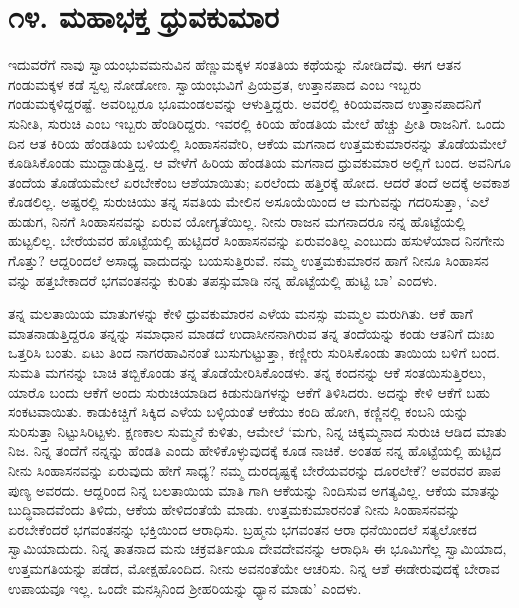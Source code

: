 
\chapter{೧೪. ಮಹಾಭಕ್ತ ಧ್ರುವಕುಮಾರ}

ಇದುವರೆಗೆ ನಾವು ಸ್ವಾಯಂಭುವಮನುವಿನ ಹೆಣ್ಣುಮಕ್ಕಳ ಸಂತತಿಯ ಕಥೆಯನ್ನು ನೋಡಿದೆವು. ಈಗ ಆತನ ಗಂಡುಮಕ್ಕಳ ಕಡೆ ಸ್ವಲ್ಪ ನೋಡೋಣ. ಸ್ವಾಯಂಭುವಿಗೆ ಪ್ರಿಯವ್ರತ, ಉತ್ತಾನಪಾದ ಎಂಬ ಇಬ್ಬರು ಗಂಡುಮಕ್ಕಳಿದ್ದರಷ್ಟೆ. ಅವರಿಬ್ಬರೂ ಭೂಮಂಡಲವನ್ನು ಆಳುತ್ತಿದ್ದರು. ಅವರಲ್ಲಿ ಕಿರಿಯವನಾದ ಉತ್ತಾನಪಾದನಿಗೆ ಸುನೀತಿ, ಸುರುಚಿ ಎಂಬ ಇಬ್ಬರು ಹೆಂಡಿರಿದ್ದರು. ಇವರಲ್ಲಿ ಕಿರಿಯ ಹೆಂಡತಿಯ ಮೇಲೆ ಹೆಚ್ಚು ಪ್ರೀತಿ ರಾಜನಿಗೆ. ಒಂದು ದಿನ ಆತ ಕಿರಿಯ ಹೆಂಡತಿಯ ಬಳಿಯಲ್ಲಿ ಸಿಂಹಾಸನವೇರಿ, ಆಕೆಯ ಮಗನಾದ ಉತ್ತಮಕುಮಾರನನ್ನು ತೊಡೆಯಮೇಲೆ ಕೂಡಿಸಿಕೊಂಡು ಮುದ್ದಾಡುತ್ತಿದ್ದ. ಆ ವೇಳೆಗೆ ಹಿರಿಯ ಹೆಂಡತಿಯ ಮಗನಾದ ಧ್ರುವಕುಮಾರ ಅಲ್ಲಿಗೆ ಬಂದ. ಅವನಿಗೂ ತಂದೆಯ ತೊಡೆಯಮೇಲೆ ಏರಬೇಕೆಂಬ ಆಶೆಯಾಯಿತು; ಏರಲೆಂದು ಹತ್ತಿರಕ್ಕೆ ಹೋದ. ಆದರೆ ತಂದೆ ಅದಕ್ಕೆ ಅವಕಾಶ ಕೊಡಲಿಲ್ಲ. ಅಷ್ಟರಲ್ಲಿ ಸುರುಚಿಯು ತನ್ನ ಸವತಿಯ ಮೇಲಿನ ಅಸೂಯೆಯಿಂದ ಆ ಮಗುವನ್ನು ಗದರಿಸುತ್ತಾ, ‘ಎಲೆ ಹುಡುಗ, ನಿನಗೆ ಸಿಂಹಾಸನವನ್ನು ಏರುವ ಯೋಗ್ಯತೆಯಿಲ್ಲ. ನೀನು ರಾಜನ ಮಗನಾದರೂ ನನ್ನ ಹೊಟ್ಟೆಯಲ್ಲಿ ಹುಟ್ಟಲಿಲ್ಲ. ಬೇರೆಯವರ ಹೊಟ್ಟೆಯಲ್ಲಿ ಹುಟ್ಟಿದರೆ ಸಿಂಹಾಸನವನ್ನು ಏರುವಂತಿಲ್ಲ ಎಂಬುದು ಹಸುಳೆಯಾದ ನಿನಗೇನು ಗೊತ್ತು? ಆದ್ದರಿಂದಲೆ ಅಸಾಧ್ಯ ವಾದುದನ್ನು ಬಯಸುತ್ತಿರುವೆ. ನಮ್ಮ ಉತ್ತಮಕುಮಾರನ ಹಾಗೆ ನೀನೂ ಸಿಂಹಾಸನ ವನ್ನು ಹತ್ತಬೇಕಾದರೆ ಭಗವಂತನನ್ನು ಕುರಿತು ತಪಸ್ಸುಮಾಡಿ ನನ್ನ ಹೊಟ್ಟೆಯಲ್ಲಿ ಹುಟ್ಟಿ ಬಾ’ ಎಂದಳು.

ತನ್ನ ಮಲತಾಯಿಯ ಮಾತುಗಳನ್ನು ಕೇಳಿ ಧ್ರುವಕುಮಾರನ ಎಳೆಯ ಮನಸ್ಸು ಮಮ್ಮಲ ಮರುಗಿತು. ಆಕೆ ಹಾಗೆ ಮಾತನಾಡುತ್ತಿದ್ದರೂ ತನ್ನನ್ನು ಸಮಾಧಾನ ಮಾಡದೆ ಉದಾಸೀನನಾಗಿರುವ ತನ್ನ ತಂದೆಯನ್ನು ಕಂಡು ಆತನಿಗೆ ದುಃಖ ಒತ್ತರಿಸಿ ಬಂತು. ಏಟು ತಿಂದ ನಾಗರಹಾವಿನಂತೆ ಬುಸುಗುಟ್ಟುತ್ತಾ, ಕಣ್ಣೀರು ಸುರಿಸಿಕೊಂಡು ತಾಯಿಯ ಬಳಿಗೆ ಬಂದ. ಸುಮತಿ ಮಗನನ್ನು ಬಾಚಿ ತಬ್ಬಿಕೊಂಡು ತನ್ನ ತೊಡೆಯೇರಿಸಿಕೊಂಡಳು. ತನ್ನ ಕಂದನನ್ನು ಆಕೆ ಸಂತಯಿಸುತ್ತಿರಲು, ಯಾರೊ ಬಂದು ಆಕೆಗೆ ಅಂದು ಸುರುಚಿಯಾಡಿದ ಕಿಡುನುಡಿಗಳನ್ನು ಆಕೆಗೆ ತಿಳಿಸಿದರು. ಅದನ್ನು ಕೇಳಿ ಆಕೆಗೆ ಬಹು ಸಂಕಟವಾಯಿತು. ಕಾಡುಕಿಚ್ಚಿಗೆ ಸಿಕ್ಕಿದ ಎಳೆಯ ಬಳ್ಳಿಯಂತೆ ಆಕೆಯು ಕಂದಿ ಹೋಗಿ, ಕಣ್ಣಿನಲ್ಲಿ ಕಂಬನಿ ಯನ್ನು ಸುರಿಸುತ್ತಾ ನಿಟ್ಟುಸಿರಿಟ್ಟಳು. ಕ್ಷಣಕಾಲ ಸುಮ್ಮನೆ ಕುಳಿತು, ಆಮೇಲೆ ‘ಮಗು, ನಿನ್ನ ಚಿಕ್ಕಮ್ಮನಾದ ಸುರುಚಿ ಆಡಿದ ಮಾತು ನಿಜ. ನಿನ್ನ ತಂದೆಗೆ ನನ್ನನ್ನು ಹೆಂಡತಿ ಎಂದು ಹೇಳಿಕೊಳ್ಳುವುದಕ್ಕೆ ಕೂಡ ನಾಚಿಕೆ. ಅಂತಹ ನನ್ನ ಹೊಟ್ಟೆಯಲ್ಲಿ ಹುಟ್ಟಿದ ನೀನು ಸಿಂಹಾಸನವನ್ನು ಏರುವುದು ಹೇಗೆ ಸಾಧ್ಯ? ನಮ್ಮ ದುರದೃಷ್ಟಕ್ಕೆ ಬೇರೆಯವರನ್ನು ದೂರಲೇಕೆ? ಅವರವರ ಪಾಪ ಪುಣ್ಯ ಅವರದು. ಆದ್ದರಿಂದ ನಿನ್ನ ಬಲತಾಯಿಯ ಮಾತಿ ಗಾಗಿ ಆಕೆಯನ್ನು ನಿಂದಿಸುವ ಅಗತ್ಯವಿಲ್ಲ. ಆಕೆಯ ಮಾತನ್ನು ಬುದ್ಧಿವಾದವೆಂದು ತಿಳಿದು, ಆಕೆಯ ಹೇಳಿದಂತೆಯೆ ಮಾಡು. ಉತ್ತಮಕುಮಾರನಂತೆ ನೀನು ಸಿಂಹಾಸನವನ್ನು ಏರಬೇಕೆಂದರೆ ಭಗವಂತನನ್ನು ಭಕ್ತಿಯಿಂದ ಆರಾಧಿಸು. ಬ್ರಹ್ಮನು ಭಗವಂತನ ಆರಾ ಧನೆಯಿಂದಲೆ ಸತ್ಯಲೋಕದ ಸ್ವಾಮಿಯಾದುದು. ನಿನ್ನ ತಾತನಾದ ಮನು ಚಕ್ರವರ್ತಿಯೂ ದೇವದೇವನನ್ನು ಆರಾಧಿಸಿ ಈ ಭೂಮಿಗೆಲ್ಲ ಸ್ವಾಮಿಯಾದ, ಉತ್ತಮಗತಿಯನ್ನು ಪಡೆದ, ಮೋಕ್ಷಹೊಂದಿದ. ನೀನು ಅವನಂತೆಯೇ ಆಚರಿಸು. ನಿನ್ನ ಆಶೆ ಈಡೇರುವುದಕ್ಕೆ ಬೇರಾವ ಉಪಾಯವೂ ಇಲ್ಲ. ಒಂದೇ ಮನಸ್ಸಿನಿಂದ ಶ್ರೀಹರಿಯನ್ನು ಧ್ಯಾನ ಮಾಡು’ ಎಂದಳು.

